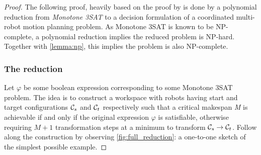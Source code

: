 \begin{proof}
	The following proof, heavily based on the proof by \cite{siamcomp/DemaineFKMS19} is done by a polynomial reduction from \emph{Monotone 3SAT} to a decision formulation of a coordinated multi-robot motion planning problem. 
	As Monotone 3SAT is known to be NP-complete, a polynomial reduction implies the reduced problem is NP-hard.
	Together with \cref{lemma:np}, this implies the problem is also NP-complete. 






	\subsubsection*{The reduction} 
	Let \(\varphi\) be some boolean expression corresponding to some Monotone 3SAT problem.
	The idea is to construct a workspace with robots having start and target configurations \(\mathcal{C}_{s}\) and \(\mathcal{C}_{t}\) respectively such that a critical makespan \emph{M} is achievable if and only if the original expression \(\varphi\) is satisfiable, otherwise requiring \(M + 1\) transformation steps at a minimum to transform \(\mathcal{C}_{s} \rightarrow \mathcal{C}_{t}\).
	Follow along the construction by observing \cref{fig:full_reduction}: a one-to-one sketch of the simplest possible example. 






\end{proof}
